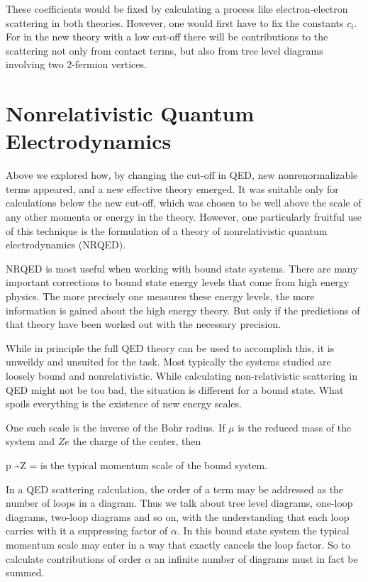 These coefficients would be fixed by calculating a process like electron-electron scattering in both theories.  However, one would first have to fix the constants $c_i$.  For in the new theory with a low cut-off there will be contributions to the scattering not only from contact terms, but also from tree level diagrams involving two 2-fermion vertices.





\section{Nonrelativistic Quantum Electrodynamics}
Above we explored how, by changing the cut-off in QED, new nonrenormalizable terms appeared, and a new effective theory emerged.  It was suitable only for calculations below the new cut-off, which was chosen to be well above the scale of any other momenta or energy in the theory.  However, one particularly fruitful use of this technique is the formulation of a theory of nonrelativistic quantum electrodynamics (NRQED).  

NRQED is most useful when working with bound state systems.  There are many important corrections to bound state energy levels that come from high energy physics.  The more precisely one measures these energy levels, the more information is gained about the high energy theory.  But only if the predictions of that theory have been worked out with the necessary precision.  %

While in principle the full QED theory can be used to accomplish this, it is unweildy and unsuited for the task.  Most typically the systems studied are loosely bound and nonrelativistic.  While calculating non-relativistic scattering in QED might not be too bad, the situation is different for a bound state.  What spoils everything is the existence of new energy scales.  

One such scale is the inverse of the Bohr radius.  If $\mu$ is the reduced mass of the system and $Ze$ the charge of the center, then 

\beq p \sim  Z \mu \alpha =  \eeq
is the typical momentum scale of the bound system.  

In a QED scattering calculation, the order of a term may be addressed as the number of loops in a diagram.  Thus we talk about tree level diagrams, one-loop diagrams, two-loop diagrams and so on, with the understanding that each loop carries with it a suppressing factor of $\alpha$.  In this bound state system the typical momentum scale may enter in a way that exactly cancels the loop factor.  So to calculate contributions of order $\alpha$ an infinite number of diagrams must in fact be summed.  

